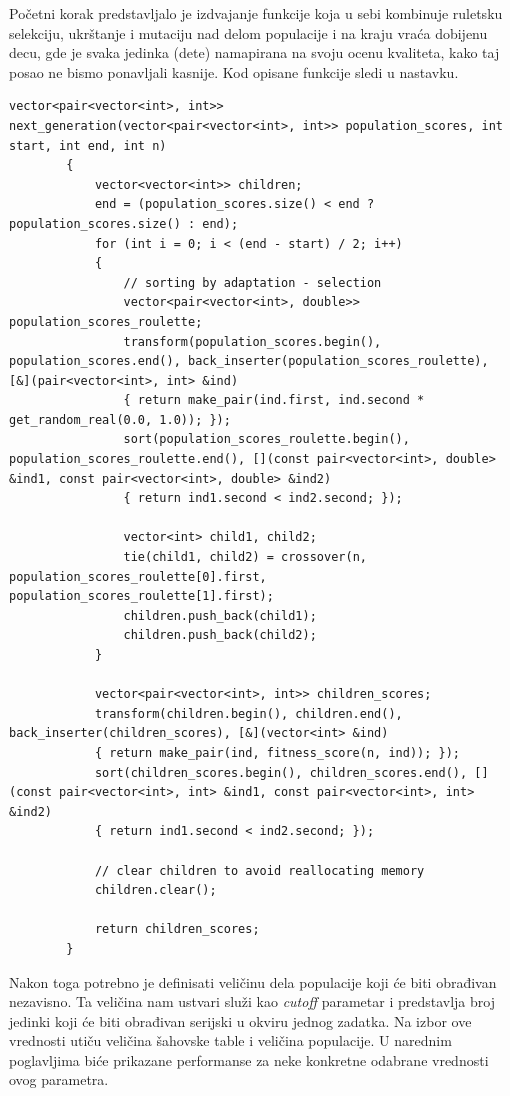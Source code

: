 \documentclass[12pt, a4paper]{article}
\begin{document}
	Početni korak predstavljalo je izdvajanje funkcije koja u sebi kombinuje ruletsku selekciju, ukrštanje i mutaciju nad delom populacije i na kraju vraća dobijenu decu, gde je svaka jedinka (dete) namapirana na svoju ocenu kvaliteta, kako taj posao ne bismo ponavljali kasnije. Kod opisane funkcije sledi u nastavku.\\
	
	\begin{lstlisting}[caption={Funkcija za računanje dela sledeće generacije}]
		vector<pair<vector<int>, int>> next_generation(vector<pair<vector<int>, int>> population_scores, int start, int end, int n)
		{
			vector<vector<int>> children;
			end = (population_scores.size() < end ? population_scores.size() : end);
			for (int i = 0; i < (end - start) / 2; i++)
			{
				// sorting by adaptation - selection
				vector<pair<vector<int>, double>> population_scores_roulette;
				transform(population_scores.begin(), population_scores.end(), back_inserter(population_scores_roulette), [&](pair<vector<int>, int> &ind)
				{ return make_pair(ind.first, ind.second * get_random_real(0.0, 1.0)); });
				sort(population_scores_roulette.begin(), population_scores_roulette.end(), [](const pair<vector<int>, double> &ind1, const pair<vector<int>, double> &ind2)
				{ return ind1.second < ind2.second; });
				
				vector<int> child1, child2;
				tie(child1, child2) = crossover(n, population_scores_roulette[0].first, population_scores_roulette[1].first);
				children.push_back(child1);
				children.push_back(child2);
			}
			
			vector<pair<vector<int>, int>> children_scores;
			transform(children.begin(), children.end(), back_inserter(children_scores), [&](vector<int> &ind)
			{ return make_pair(ind, fitness_score(n, ind)); });
			sort(children_scores.begin(), children_scores.end(), [](const pair<vector<int>, int> &ind1, const pair<vector<int>, int> &ind2)
			{ return ind1.second < ind2.second; });
			
			// clear children to avoid reallocating memory
			children.clear();
			
			return children_scores;
		}
	\end{lstlisting}
	
	Nakon toga potrebno je definisati veličinu dela populacije koji će biti obrađivan nezavisno. Ta veličina nam ustvari služi kao \textit{cutoff} parametar i predstavlja broj jedinki koji će biti obrađivan serijski u okviru jednog zadatka. Na izbor ove vrednosti utiču veličina šahovske table i veličina populacije. U narednim poglavljima biće prikazane performanse za neke konkretne odabrane vrednosti ovog parametra.
	
\end{document}
